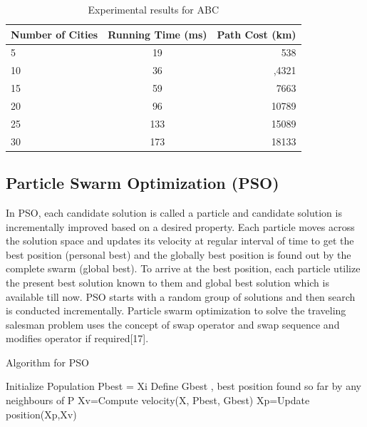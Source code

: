 \documentclass[conference]{IEEEtran}
\begin{document}
\begin{table}[h!]
 \label{tab:table1}\caption{Experimental results for ABC}
  \begin{center}
    \begin{tabular}{l|c|r}
      \textbf{Number of Cities} & \textbf{Running Time (ms)} & \textbf{Path Cost (km)}\\
      \hline
      5 & 19 & 538\\
      10 & 36& ,4321\\
      15 & 59  & 7663\\
      20 & 96  & 10789\\ 
      25 & 133 & 15089\\
      30 & 173  & 18133\\
    \end{tabular}
  \end{center}
\end{table}


\subsection {Particle Swarm Optimization (PSO)}
In PSO, each candidate solution is called a particle and candidate solution is incrementally improved based on a desired property. Each particle moves across the solution space and  updates its velocity at regular interval of time to get the best position (personal best) and the globally best position is found out by the complete swarm (global best). To arrive at the best position, each particle utilize the present best solution known to them and global best solution which is available till now. PSO starts with a random group of solutions and then search is conducted incrementally. Particle swarm optimization to solve the traveling salesman problem uses the concept of swap operator and swap sequence and modifies operator if required[17]. 

\begin{algorithm}[H]
\caption{Algorithm for PSO}
\begin{algorithmic}[1]
\STATE Initialize Population
\REPEAT
{}
\STATE Pbest = Xi
\ENDIF
\ENDFOR 
\STATE Define Gbest , best position found so far by any neighbours of P
\STATE Xv=Compute velocity(X, Pbest, Gbest)
\STATE Xp=Update position(Xp,Xv)
\ENDFOR
{} 
\end{algorithmic}
\end{algorithm} 
\end{document}
